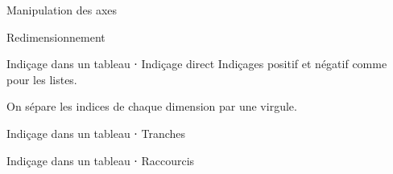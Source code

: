 \begin{frame}{Manipulation des axes}
\end{frame}

\begin{frame}{Redimensionnement}
\end{frame}

\begin{frame}{Indiçage dans un tableau ⋅ Indiçage direct}
  Indiçages positif et négatif comme pour les listes.

  On sépare les indices de chaque dimension par une virgule.

\end{frame}

\begin{frame}{Indiçage dans un tableau ⋅ Tranches}
\end{frame}

\begin{frame}{Indiçage dans un tableau ⋅ Raccourcis}
\end{frame}
